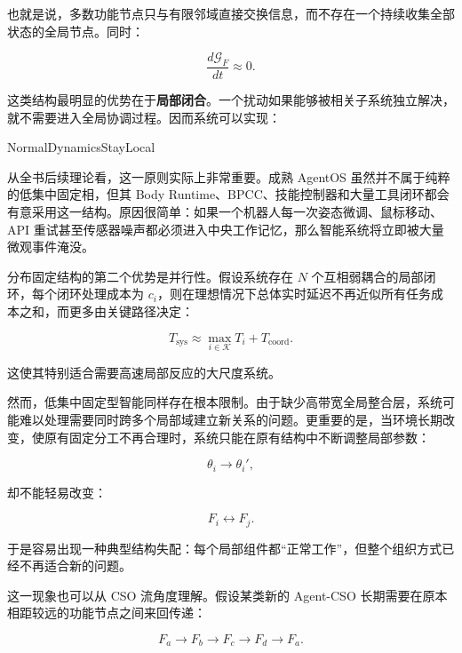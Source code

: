 也就是说，多数功能节点只与有限邻域直接交换信息，而不存在一个持续收集全部状态的全局节点。同时：

\begin{equation}
\frac{d\mathcal{G}_{F}}{dt}
\approx0.
\end{equation}

这类结构最明显的优势在于\textbf{局部闭合}。一个扰动如果能够被相关子系统独立解决，就不需要进入全局协调过程。因而系统可以实现：

\begin{statementbox}
NormalDynamicsStayLocal
\end{statementbox}

从全书后续理论看，这一原则实际上非常重要。成熟 AgentOS 虽然并不属于纯粹的低集中固定相，但其 Body Runtime、BPCC、技能控制器和大量工具闭环都会有意采用这一结构。原因很简单：如果一个机器人每一次姿态微调、鼠标移动、API 重试甚至传感器噪声都必须进入中央工作记忆，那么智能系统将立即被大量微观事件淹没。

分布固定结构的第二个优势是并行性。假设系统存在 $N$ 个互相弱耦合的局部闭环，每个闭环处理成本为 $c_i$，则在理想情况下总体实时延迟不再近似所有任务成本之和，而更多由关键路径决定：

\begin{equation}
T_{\mathrm{sys}}
\approx
\max_{i\in\mathcal{K}}
T_i
+
T_{\mathrm{coord}}.
\end{equation}

这使其特别适合需要高速局部反应的大尺度系统。

然而，低集中固定型智能同样存在根本限制。由于缺少高带宽全局整合层，系统可能难以处理需要同时跨多个局部域建立新关系的问题。更重要的是，当环境长期改变，使原有固定分工不再合理时，系统只能在原有结构中不断调整局部参数：

\begin{equation}
\theta_i
\rightarrow
\theta_i',
\end{equation}

却不能轻易改变：

\begin{equation}
F_i\leftrightarrow F_j.
\end{equation}

于是容易出现一种典型结构失配：每个局部组件都“正常工作”，但整个组织方式已经不再适合新的问题。

这一现象也可以从 CSO 流角度理解。假设某类新的 Agent-CSO 长期需要在原本相距较远的功能节点之间来回传递：

\begin{equation}
F_a
\rightarrow
F_b
\rightarrow
F_c
\rightarrow
F_d
\rightarrow
F_a.
\end{equation}

